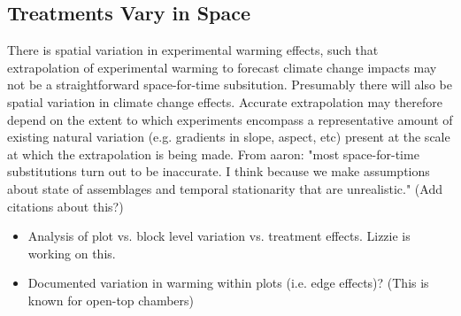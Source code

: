 \documentclass{article}
\begin{document}
\subsection {Treatments Vary in Space}
There is spatial variation in experimental warming effects, such that extrapolation of experimental warming to forecast climate change impacts may not be a straightforward space-for-time subsitution. Presumably there will also be spatial variation in climate change effects.  Accurate extrapolation may therefore depend on the extent to which experiments encompass a representative amount of existing natural variation (e.g. gradients in slope, aspect, etc) present at the scale at which the extrapolation is being made. From aaron: "most space-for-time substitutions turn out to be inaccurate. I think because we make assumptions about state of assemblages and temporal stationarity that are unrealistic." (Add citations about this?)
\begin{itemize}
\item Analysis of plot vs. block level variation vs. treatment effects. Lizzie is working on this.
\item Documented variation in warming within plots (i.e. edge effects)? (This is known for open-top chambers)
\end{itemize}
\end{document}

